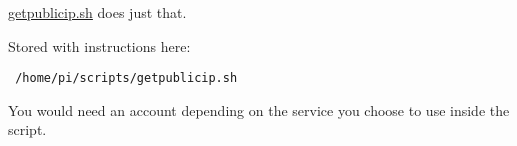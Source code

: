\href{https://github.com/HestiaPi/hestia-touch-openhab/blob/ONE/home/pi/scripts/getpublicip.sh}
{getpublicip.sh} does just that.

Stored with instructions here:

\texttt{    /home/pi/scripts/getpublicip.sh}

You would need an account depending on the service you choose to use inside the script.
